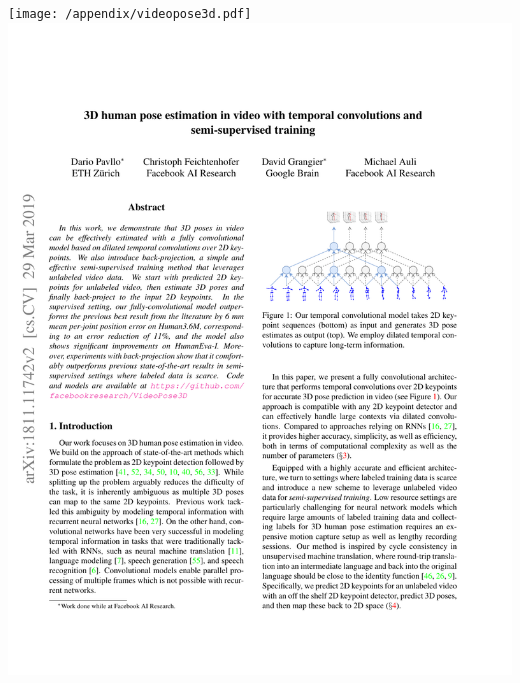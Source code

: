 \usepackage{graphicx}
\iffalse
{}

\centering
\texttt{[image: /appendix/videopose3d.pdf]}
\includegraphics[width=\textwidth, page=2, trim=28mm 30mm 28mm 15mm]{appendix/videopose3d.pdf}
